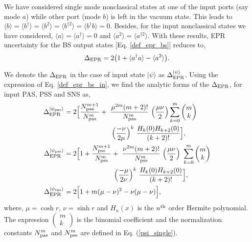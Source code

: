 \documentclass[letter,scriptaddress,twocolumn, prl,showkeys]{revtex4}
\begin{document}
We have considered single mode nonclassical states at one of the input ports (say mode $a$) while other port (mode $b$) is left in the vacuum state. 
This leads to $\langle b\rangle=\langle b^{\dagger}\rangle=\langle b^{2}\rangle=\langle b^{\dagger 2}\rangle=\langle b^{\dagger}b\rangle=0$. 
Besides, for the input nonclassical states we have considered, $\langle a\rangle=\langle a^{\dagger}\rangle=0$ and $\langle a^{2}\rangle=\langle a^{\dagger 2}\rangle$. 
With these results, EPR uncertainty for the BS output states [Eq. \ref{def_epr_bs}] reduces to,
\begin{equation}
\Delta_{\rm{EPR}}=2\big( 1 + \langle a^{\dagger}a\rangle - \langle a^{2}\rangle \big) \label{def_epr_bs_in}.
\end{equation}

We denote the $\Delta_{\rm{EPR}}$ in the case of input state $|\psi\rangle$ as $\Delta_{\rm{EPR}}^{|\psi\rangle}$. Using the expression of Eq. \ref{def_epr_bs_in}, we find the analytic forms of the $\Delta_{\rm{EPR}}$, for input PAS, PSS and SNS as,
\begin{subequations}
\label{epr_psi_input}
\begin{align}
\Delta_{\rm{EPR}}^{|\psi_{\rm{pas}}\rangle}&=2\Big[ \frac{N^{m+1}_{\rm{pas}}}{N^{m}_{\rm{pas}}} + ~\frac{\mu^{2m}(m+2)!}{N^{m}_{\rm{pas}}}~\Big(\frac{\mu\nu}{2}\Big) \sum_{k=0}^{m} \begin{pmatrix}
m\\
k
\end{pmatrix} \nonumber\\
&~~~~~~~~~~~~~~~~~~~~~ \Big(\frac{-\nu}{2\mu}\Big)^{k}~\frac{H_{k}(0)H_{k+2}(0)}{(k+2)!} \Big], \\
\Delta_{\rm{EPR}}^{|\psi_{\rm{pss}}\rangle}&=2\Big[1+ \frac{N^{m+1}_{\rm{pss}}}{N^{m}_{\rm{pss}}} + ~\frac{\nu^{2m}(m+2)!}{N^{m}_{\rm{pss}}}~\Big(\frac{\mu\nu}{2}\Big)~ \sum_{k=0}^{m} \begin{pmatrix}
m\\
k
\end{pmatrix} \nonumber \\
&~~~~~~~~~~~~~~~~~~~~~~ \Big(\frac{-\mu}{2\nu}\Big)^{k}~ \frac{H_{k}(0)H_{k+2}(0)}{(k+2)!} \Big], \\
\Delta_{\rm{EPR}}^{|\psi_{\rm{sns}}\rangle}&=2\Big[1+ m(\mu-\nu)^{2}-\nu(\mu-\nu) \Big],
\end{align}
\end{subequations}
where, $\mu=\cosh r$, $\nu=\sinh r$ and $H_{n}(x)$ is the $n^{\rm{th}}$ order Hermite polynomial. The expression $\begin{pmatrix}
m\\
k
\end{pmatrix}$ is the binomial coefficient and the normalization constants $N^{m}_{\rm{pas}}$ and $N^{m}_{\rm{pss}}$ are defined in Eq. (\ref{psi_single}).
\end{document}
